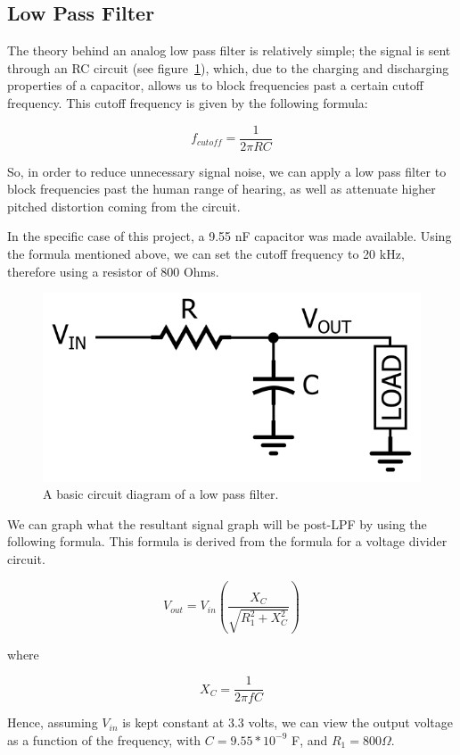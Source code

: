 \subsection{Low Pass Filter}\label{subsec:low-pass-filter}

The theory behind an analog low pass filter is relatively simple;
the signal is sent through an RC circuit (see figure~\ref{fig:LPF}), which, due to the charging and discharging properties of a capacitor, allows us to block frequencies past a certain cutoff frequency.
This cutoff frequency is given by the following formula:

\[
f_{cutoff}=\frac{1}{2 \pi R C}
\]

So, in order to reduce unnecessary signal noise, we can apply a low pass filter to block frequencies past the human range of hearing, as well as attenuate higher pitched distortion coming from the circuit. 

In the specific case of this project, a 9.55 nF capacitor was made available.
Using the formula mentioned above, we can set the cutoff frequency to 20 kHz, therefore using a resistor of 800 Ohms. 

\begin{figure}[H]
    \centering
    \includegraphics[width = 0.4 \textwidth]{lowpassfilter}
    \caption{A basic circuit diagram of a low pass filter. } %
    \label{fig:LPF}
\end{figure}

We can graph what the resultant signal graph will be post-LPF by using the following formula. This formula is derived from the formula for a voltage divider circuit. 



\[
V_{out}=V_{in}\left(\frac{X_{C}}{\sqrt{R_{1}^{2}+X_{C}^{2}}}\right)
\]

where

\[
X_{C}=\frac{1}{2 \pi f C}
\]

Hence, assuming $V_{in}$ is kept constant at 3.3 volts, we can view the output voltage as a function of the frequency, with $C = 9.55*10^{-9}$ F, and $R_1 = 800 \Omega$. 

